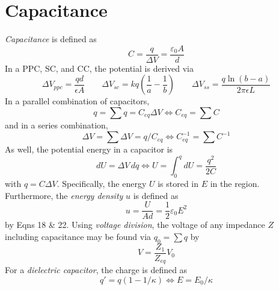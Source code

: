 \documentclass{tufte-book}
\begin{document}
\section{Capacitance}
\emph{Capacitance} is defined as
\begin{equation}
  C = \frac{q}{\Delta V} = \frac{\varepsilon_0 A}{d}
\end{equation}
In a PPC, SC, and CC, the potential is derived via
\begin{equation}
  \Delta V_{ppc} = \frac{qd}{\epsilon A} \qquad \Delta V_{sc} =kq \left(\frac{1}{a} - \frac{1}{b} \right) \qquad \Delta V_{ss} = \frac{q \ln (b-a)}{2 \pi \epsilon L}
\end{equation}
In a parallel combination of capacitors,
\begin{equation}
  q = \sum q  = C_{eq} \Delta V \iff  C_{eq} = \sum C
\end{equation}
and in a series combination,
\begin{equation}
  \Delta V = \sum \Delta V = q/C_{eq} \iff C_{eq}^{-1} = \sum C^{-1}
\end{equation}
As well, the potential energy in a capacitor is
\begin{equation}
  dU = \Delta V \, dq \iff U = \int_0^q dU = \frac{q^2}{2C}
\end{equation}
with $q = C \Delta V$. Specifically, the energy $U$ is stored in $E$ in the region. Furthermore, the \emph{energy density} $u$ is defined as \begin{equation}
  u = \frac{U}{Ad} = \textstyle\frac{1}{2} \varepsilon_0 E^2
\end{equation}
by Eqns 18 \& 22. Using \emph{voltage division}, the voltage of any impedance $Z$ including capacitance may be found via $q_0 = \sum q$ by \begin{equation}
  V = \frac{Z_1}{Z_{eq}} V_0
\end{equation}
For a \emph{dielectric capacitor}, the charge is defined as
\begin{equation}
  q' = q (1 - 1/\kappa) \iff E = E_0/\kappa
\end{equation}
\end{document}

